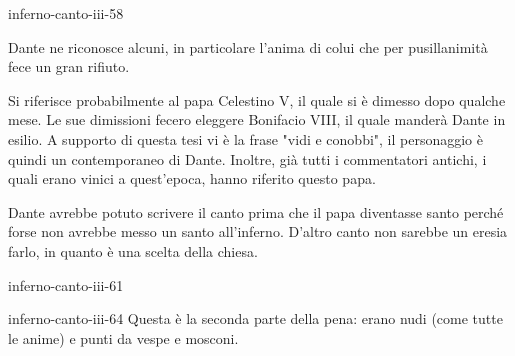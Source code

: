 \documentclass[preview]{standalone}
\begin{document}
\begin{snippet}{inferno-canto-iii-58}
    
    Dante ne riconosce alcuni, in particolare l'anima di colui
    che per pusillanimità fece un gran rifiuto.

    Si riferisce probabilmente al papa Celestino V, il quale si è dimesso
    dopo qualche mese. Le sue dimissioni fecero eleggere Bonifacio VIII, il quale manderà Dante in esilio.
    A supporto di questa tesi vi è la frase "vidi e conobbi", il personaggio è quindi un contemporaneo
    di Dante. Inoltre, già tutti i commentatori antichi, i quali erano vinici a quest'epoca,
    hanno riferito questo papa.

    Dante avrebbe potuto scrivere il canto prima che il papa diventasse santo
    perché forse non avrebbe messo un santo all'inferno.
    D'altro canto non sarebbe un eresia farlo, in quanto è una scelta della chiesa.
\end{snippet}

\begin{snippet}{inferno-canto-iii-61}
\end{snippet}

\begin{snippet}{inferno-canto-iii-64}
    Questa è la seconda parte della pena: erano nudi (come tutte le anime)
    e punti da vespe e mosconi.
\end{snippet}
\end{document}
